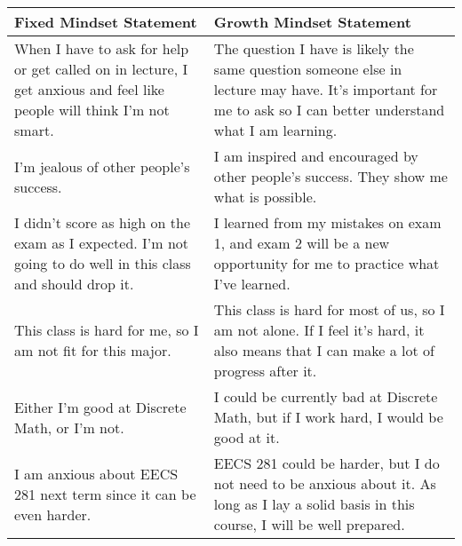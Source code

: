 \documentclass[12pt]{exam}
\begin{document}
\begin{solution}
    \begin{center}
        \begin{tabular}{ |p{18em}|p{18em}| } 
        \hline
        \textbf{Fixed Mindset Statement} & \textbf{Growth Mindset Statement}\\
        \hline
        
        When I have to ask for help or get called on in lecture, I get anxious and feel like people will think I’m not smart.
        
        & The question I have is likely the same question someone else in lecture may have. It's important for me to ask so I can better understand what I am learning.
        \\ \hline
        
        I'm jealous of other people's success.
        
        & I am inspired and encouraged by other people's success. They show me what is possible.
        
        \\ \hline
        
        I didn't score as high on the exam as I expected. I'm not going to do well in this class and should drop it.
        
        & I learned from my mistakes on exam 1, and exam 2 will be a new opportunity for me to practice what I've learned.
        
        \\ \hline
        
        This class is hard for me, so I am not fit for this major.
        & This class is hard for most of us, so I am not alone. If I feel it's hard, it also means that I can make a lot of progress after it.
        \\ \hline
        
        Either I'm good at Discrete Math, or I'm not. 
        & I could be currently bad at Discrete Math, but if I work hard, I would be good at it.
        \\ \hline
        
        I am anxious about EECS 281 next term since it can be even harder.
        & EECS 281 could be harder, but I do not need to be anxious about it. As long as I lay a solid basis in this course, I will be well prepared.\\ 
        \hline
        \end{tabular}
        \end{center}
        
\end{solution}
\end{document}
